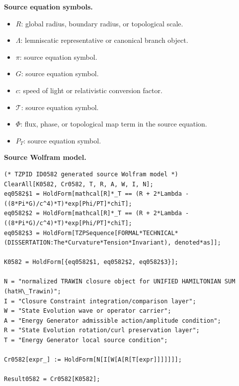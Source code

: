 \begin{minipage}[t]{0.49\linewidth}
\begingroup
\small
\raggedright
\textbf{Source equation symbols.}\par
\begin{itemize}[leftmargin=1.35em,itemsep=1pt,topsep=1pt,parsep=0pt]
    \item $R$: global radius, boundary radius, or topological scale.
    \item $\Lambda$: lemniscatic representative or canonical branch object.
    \item $\pi$: source equation symbol.
    \item $G$: source equation symbol.
    \item $c$: speed of light or relativistic conversion factor.
    \item $\mathcal{T}$: source equation symbol.
    \item $\Phi$: flux, phase, or topological map term in the source equation.
    \item $P_T$: source equation symbol.
\end{itemize}
\endgroup
\end{minipage}\hfill
\begin{minipage}[t]{0.47\linewidth}
\begingroup
\scriptsize
\raggedright
\textbf{Source Wolfram model.}\par
\begin{Verbatim}[fontsize=\tiny,breaklines=true,breakanywhere=true]
(* TZPID ID0582 generated source Wolfram model *)
ClearAll[K0582, Cr0582, T, R, A, W, I, N];
eq0582$1 = HoldForm[mathcal[R]*_T == (R + 2*Lambda - ((8*Pi*G)/c^4)*T)*exp[Phi/PT]*chiT];
eq0582$2 = HoldForm[mathcal[R]*_T == (R + 2*Lambda - ((8*Pi*G)/c^4)*T)*exp[Phi/PT]*chiT];
eq0582$3 = HoldForm[TZPSequence[FORMAL*TECHNICAL*(DISSERTATION:The*Curvature*Tension*Invariant), denoted*as]];

K0582 = HoldForm[{eq0582$1, eq0582$2, eq0582$3}];

N = "normalized TRAWIN closure object for UNIFIED HAMILTONIAN SUM (hatH\_Trawin)";
I = "Closure Constraint integration/comparison layer";
W = "State Evolution wave or operator carrier";
A = "Energy Generator admissible action/amplitude condition";
R = "State Evolution rotation/curl preservation layer";
T = "Energy Generator local source condition";

Cr0582[expr_] := HoldForm[N[I[W[A[R[T[expr]]]]]]];

Result0582 = Cr0582[K0582];
\end{Verbatim}
\endgroup
\end{minipage}

